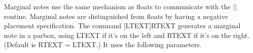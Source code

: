    Marginal notes use the same mechanism as floats to communicate
   with the |\output|  routine.  Marginal notes are distinguished from
   floats by having a negative placement specification.  The command
  \CMDI{\marginpar}[LTEXT]{RTEXT} generates a marginal note in a parbox,
    using LTEXT if it's on the left and RTEXT if it's on the right.
   (Default is RTEXT = LTEXT.)  It uses the following parameters.
%
%
%
%
%
%
%
%
%
 \begin{macro}{\marginpar}
    \begin{teX}
\def\marginpar{%
  \ifhmode
    \@bsphack
    \@floatpenalty -\@Mii
  \else
    \@floatpenalty-\@Miii
  \fi
  \ifinner
    \@parmoderr
    \@floatpenalty\z@
  \else
    \@next\@currbox\@freelist{}{}%
    \@next\@marbox\@freelist{\global\count\@marbox\m@ne}%
       {\@floatpenalty\z@
        \@fltovf\def\@currbox{\@tempboxa}\def\@marbox{\@tempboxa}}%
  \fi
  \@ifnextchar [\@xmpar\@ympar}
    \end{teX}
 \end{macro}

